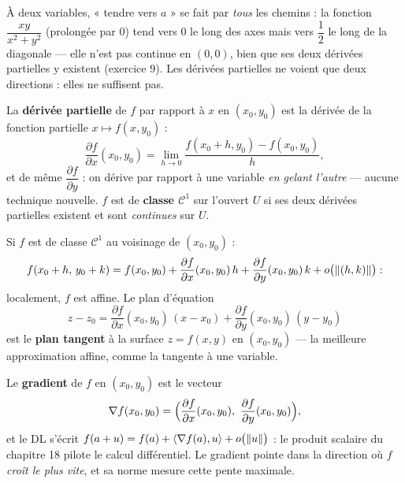 \begin{attention}
À deux variables, « tendre vers $a$ » se fait par \emph{tous} les
chemins : la fonction $\dfrac{xy}{x^{2}+y^{2}}$ (prolongée par $0$) tend
vers $0$ le long des axes mais vers $\dfrac12$ le long de la diagonale —
elle n'est pas continue en $(0,0)$, bien que ses deux dérivées partielles
y existent (exercice 9). Les dérivées partielles ne voient que deux
directions : elles ne suffisent pas.
\end{attention}


\begin{definition}
La \textbf{dérivée partielle} de $f$ par rapport à $x$ en $(x_0,y_0)$ est
la dérivée de la fonction partielle $x\mapsto f(x,y_0)$ :
\[
\frac{\partial f}{\partial x}(x_0,y_0)
=\lim_{h\to0}\frac{f(x_0+h,y_0)-f(x_0,y_0)}{h} ,
\]
et de même $\dfrac{\partial f}{\partial y}$ : on dérive par rapport à une
variable \emph{en gelant l'autre} — aucune technique nouvelle. $f$ est de
\textbf{classe $\mathcal{C}^{1}$} sur l'ouvert $U$ si ses deux dérivées
partielles existent et sont \emph{continues} sur $U$.
\end{definition}


\begin{theoreme}
Si $f$ est de classe $\mathcal{C}^{1}$ au voisinage de $(x_0,y_0)$ :
\[
f(x_0+h,\,y_0+k)=f(x_0,y_0)
+\frac{\partial f}{\partial x}(x_0,y_0)\,h
+\frac{\partial f}{\partial y}(x_0,y_0)\,k
+o\bigl(\left\lVert(h,k)\right\rVert\bigr) :
\]
localement, $f$ est affine. Le plan d'équation
\[
z-z_0=\frac{\partial f}{\partial x}(x_0,y_0)\,(x-x_0)
+\frac{\partial f}{\partial y}(x_0,y_0)\,(y-y_0)
\]
est le \textbf{plan tangent} à la surface $z=f(x,y)$ en $(x_0,y_0)$ — la
meilleure approximation affine, comme la tangente à une variable.
\end{theoreme}

\begin{definition}[Gradient]
Le \textbf{gradient} de $f$ en $(x_0,y_0)$ est le vecteur
\[
\nabla f(x_0,y_0)=\Bigl(\frac{\partial f}{\partial x}(x_0,y_0),\
\frac{\partial f}{\partial y}(x_0,y_0)\Bigr),
\]
et le DL s'écrit
$f(a+u)=f(a)+\langle\nabla f(a),u\rangle+o\bigl(\left\lVert u\right\rVert\bigr)$ : le
produit scalaire du chapitre 18 pilote le calcul différentiel. Le
gradient pointe dans la direction où $f$ \emph{croît le plus vite}, et sa
norme mesure cette pente maximale.
\end{definition}

